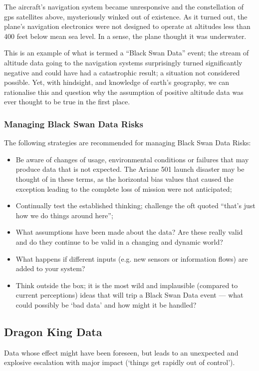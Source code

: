 The aircraft's navigation system became unresponsive and the constellation of \gls{gps} satellites above, mysteriously winked out of existence. As it turned out, the plane's navigation electronics were not designed to operate at altitudes less than 400 feet below mean sea level. In a sense, the plane thought it was underwater.

This is an example of what is termed a “Black Swan Data” event; the stream of altitude data going to the navigation systems surprisingly turned significantly negative and could have had a catastrophic result; a situation not considered possible. Yet, with hindsight, and knowledge of earth’s geography, we can rationalise this and question why the assumption of positive altitude data was ever thought to be true in the first place.

\subsubsection{Managing Black Swan Data Risks}
The following strategies are recommended for managing Black Swan Data Risks:
\begin{itemize}
\item Be aware of changes of usage, environmental conditions or failures that may produce data
that is not expected.
The Ariane 501 launch disaster may be thought of in these terms,
as the horizontal bias values that caused the exception leading to the complete loss of mission
were not anticipated;
\item Continually test the established thinking; challenge the oft quoted
“that’s just how we do things around here”;
\item What assumptions have been made about the data?
Are these really valid and do they continue to be valid in a changing and dynamic world?
\item What happens if different inputs (e.g. new sensors or \gls{information} flows)
are added to your system?
\item Think outside the box;
it is the most wild and implausible (compared to current perceptions)
ideas that will trip a Black Swan Data event ---
what could possibly be ‘bad data’ and how might it be handled?
\end{itemize}

\subsection{Dragon King Data}
 Data whose effect might have been foreseen, but leads to an unexpected and explosive escalation
with major impact (‘things get rapidly out of control’).

